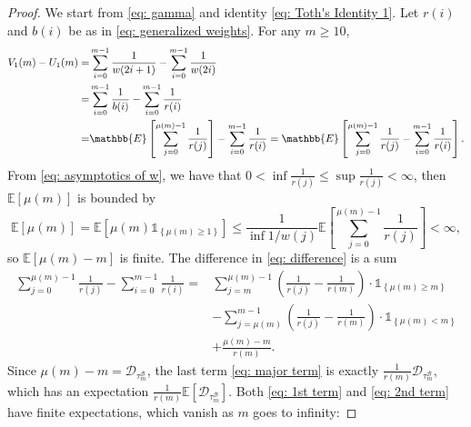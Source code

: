 \documentclass[EJP]{ejpecp} %
\begin{document}
\begin{proof} 
	We start from \eqref{eq: gamma} and identity \eqref{eq: Toth's Identity 1}. 
	Let $r(i)$ and $b(i)$ be as in \eqref{eq: generalized weights}.
	For any $m \geq 10$,
	\begin{align}
		V_1(m) - U_1(m) =& \sum_{i=0}^{m-1} \frac{1}{w(2i+1)} -\sum_{i=0}^{m-1} \frac{1}{w(2i)} 
		\notag \\
		=& \sum_{i=0}^{m-1} \frac{1}{b(i)} -\sum_{i=0}^{m-1} \frac{1}{r(i)} 
		\notag \\
		=& 	\mathbb{E}\left[  \sum_{j=0}^{ \mu(m)-1 } \frac{1}{r(j)}   \right] - \sum_{i=0}^{m-1} \frac{1}{r(i)} = \mathbb{E}\left[  \sum_{j=0}^{ \mu(m)-1 } \frac{1}{r(j)}    - \sum_{i=0}^{m-1} \frac{1}{r(i)}\right]. \label{eq: difference}
	\end{align}
	From \eqref{eq: asymptotics of w}, we have that $0< \inf \frac{1}{r(j)} \leq \sup \frac{1}{r(j)} <\infty $, then $\mathbb{E}\left[\mu(m)\right]$ is bounded by
	$$\mathbb{E}\left[ \mu(m) \right] = \mathbb{E}\left[ \mu(m)\mathbb{1}_{\left\{\mu(m)\geq 1 \right\} } \right] \leq  \frac{1}{\inf 1/w(j) }\mathbb{E}\left[  \sum_{j=0}^{ \mu(m)-1 } \frac{1}{r(j)}   \right] <\infty, $$ 
	so $ \mathbb{E}\left[ \mu(m) -m\right]  $ is finite.
	The difference in \eqref{eq: difference} is a sum
	\begin{align} 
		\sum_{j=0}^{ \mu(m)-1 } \frac{1}{r(j)} - \sum_{i=0}^{m-1} \frac{1}{r(i)} =& \sum_{j=m}^{\mu(m)-1} \left(\frac{1}{r(j)} -\frac{1}{r(m)} \right) \cdot\mathbb{1}_{\left\{\mu(m)\geq m\right\}} 
		\label{eq: 1st term}
		\\	
		& - \sum_{j=\mu(m)}^{m-1} \left(\frac{1}{r(j)} -\frac{1}{r(m)} \right) \cdot \mathbb{1}_{\left\{\mu(m)< m\right\}} 
		\label{eq: 2nd term}
		\\
		& + \frac{\mu(m)-m}{ r(m) }. \label{eq: major term}
	\end{align} 
	Since $\mu(m)-m = \mathscr{D}_{\tau^{\mathscr{B}}_m}$, the last term \eqref{eq: major term} is exactly $\frac{1}{r(m)} \mathscr{D}_{\tau^{\mathscr{B}}_m}$, which has an expectation $\frac{1}{r(m)} \mathbb{E}\left[\mathscr{D}_{\tau^{\mathscr{B}}_m}\right].$ Both \eqref{eq: 1st term} and \eqref{eq: 2nd term} have finite expectations, which vanish as $m$ goes to infinity:
	

\end{proof}
\end{document}

